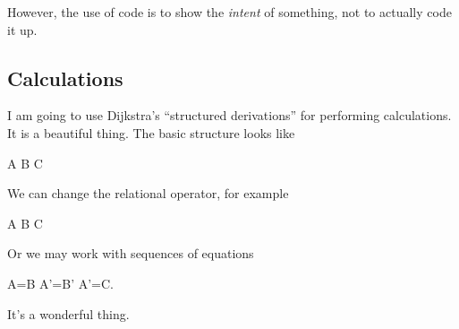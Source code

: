 However, the use of code is to show the \emph{intent} of something, not
to actually code it up.


\subsection*{Calculations} I am going to use Dijkstra's ``structured
derivations'' for performing calculations. It is a beautiful thing. The
basic structure looks like
\begin{calculation}
  A
  B
  C
\end{calculation}
We can change the relational operator, for example
\begin{calculation}
  A
  B
  C
\end{calculation}
Or we may work with sequences of equations
\begin{calculation}
  A=B
  A'=B'
  A'=C.
\end{calculation}
It's a wonderful thing.